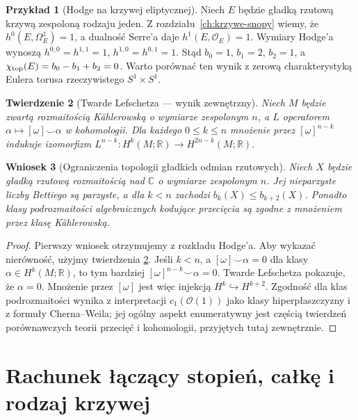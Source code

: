 \documentclass[11pt,a4paper,openany]{report}
\numberwithin{equation}{section}
\theoremstyle{plain}
\newtheorem{twierdzenie}{Twierdzenie}[section]
\newtheorem{wniosek}[twierdzenie]{Wniosek}
\theoremstyle{definition}
\newtheorem{przyklad}[twierdzenie]{Przykład}
\theoremstyle{remark}
\newcommand{\R}{\mathbb R}
\newcommand{\C}{\mathbb C}
\begin{document}
\begin{przyklad}[Hodge na krzywej eliptycznej]
Niech $E$ będzie gładką rzutową krzywą zespoloną
rodzaju jeden. Z rozdziału~\ref{ch:krzywe-snopy}
wiemy, że $h^0(E,\Omega_E^1)=1$, a dualność
Serre'a daje $h^1(E,\mathcal O_E)=1$.
Wymiary Hodge'a wynoszą
$h^{0,0}=h^{1,1}=1$, $h^{1,0}=h^{0,1}=1$.
Stąd $b_0=1$, $b_1=2$, $b_2=1$, a
$\chi_{\rm top}(E)=b_0-b_1+b_2=0$.
Warto porównać ten wynik z zerową charakterystyką
Eulera torusa rzeczywistego $S^1\times S^1$.
\end{przyklad}

\begin{twierdzenie}[Twarde Lefschetza — wynik zewnętrzny]
\label{tw:ga9-hard-lefschetz}
Niech $M$ będzie zwartą rozmaitością Kählerowską
o wymiarze zespolonym $n$, a $L$ operatorem
$\alpha\mapsto[\omega]\smile\alpha$ w kohomologii.
Dla każdego $0\le k\le n$ mnożenie przez
$[\omega]^{n-k}$ indukuje izomorfizm
$L^{n-k}:H^k(M;\R)\to H^{2n-k}(M;\R)$.
\end{twierdzenie}

\begin{wniosek}[Ograniczenia topologii gładkich odmian rzutowych]
Niech $X$ będzie gładką rzutową rozmaitością nad $\C$
o wymiarze zespolonym $n$. Jej nieparzyste liczby
Bettiego są parzyste, a dla $k<n$ zachodzi
$b_k(X)\le b_{k+2}(X)$. Ponadto klasy podrozmaitości
algebraicznych kodujące przecięcia są zgodne z
mnożeniem przez klasę Kählerowską.
\end{wniosek}
\begin{proof}
Pierwszy wniosek otrzymujemy z rozkładu Hodge'a.
Aby wykazać nierówność, użyjmy twierdzenia
\ref{tw:ga9-hard-lefschetz}. Jeśli $k<n$, a
$[\omega]\smile\alpha=0$ dla klasy
$\alpha\in H^k(M;\R)$, to tym bardziej
$[\omega]^{n-k}\smile\alpha=0$. Twarde Lefschetza
pokazuje, że $\alpha=0$. Mnożenie przez $[\omega]$
jest więc injekcją $H^k\hookrightarrow H^{k+2}$.
Zgodność dla klas podrozmaitości wynika z
interpretacji $c_1(\mathcal O(1))$ jako klasy
hiperpłaszczyzny i z formuły Cherna--Weila;
jej ogólny aspekt enumeratywny jest częścią
twierdzeń porównawczych teorii przecięć i
kohomologii, przyjętych tutaj zewnętrznie.
\end{proof}

\section{Rachunek łączący stopień, całkę i rodzaj krzywej}
\label{sec:ga9-degree-genus}
\end{document}
